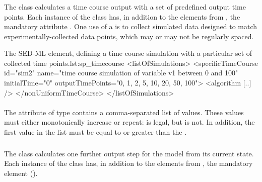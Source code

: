 \begin{blockChanged}
\subsubsection{}
\label{class:specificTimeCourse}
The \SpecificTimeCourse class calculates a time course output with a set of predefined output time points.  Each instance of the \SpecificTimeCourse class has, in addition to the elements from \TimeCourse, the mandatory attribute \hyperref[sec:outputTimePoints]{}. One use of a \SpecificTimeCourse is to collect simulated data designed to match experimentally-collected data points, which may or may not be regularly spaced.

\begin{myXmlLst}{The SED-ML  element, defining a time course simulation with a particular set of collected time points.}{lst:sp_timecourse}
<listOfSimulations>
	<specificTimeCourse id="sim2"  name="time course simulation of variable v1 between 0 and 100"  
		initialTime="0" outputTimePoints="0, 1, 2, 5, 10, 20, 50, 100">
		<algorithm [..] />
 	</nonUniformTimeCourse>
</listOfSimulations>
\end{myXmlLst}

\paragraph*{}
\label{sec:outputTimePoints}
The  attribute of type  contains a comma-separated list of values.  These values must either monotonically increase or repeat:   is legal, but  is not.  In addition, the first value in the list must be equal to or greater than the \hyperref[sec:initialTime]{}.

\end{blockChanged}

\subsubsection{}
\label{class:oneStep}

The  class calculates one further output step for the model from its current state. Each instance of the  class has, in addition to the elements from \Simulation, the mandatory element \hyperref[sec:step]{} ().

